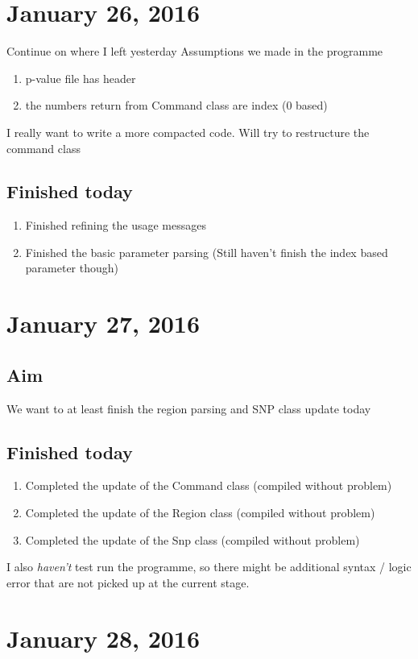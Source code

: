 \documentclass[12pt]{article}
\begin{document}
	\section{January 26, 2016}
	Continue on where I left yesterday
	Assumptions we made in the programme
	\begin{enumerate}
		\item p-value file has header
		\item the numbers return from Command class are index (0 based)
	\end{enumerate}
	I really want to write a more compacted code.
	Will try to restructure the command class
	\subsection{Finished today}
	\begin{enumerate}
		\item Finished refining the usage messages
		\item Finished the basic parameter parsing (Still haven't finish the index based parameter though)
	\end{enumerate}
	\section{January 27, 2016}
	\subsection{Aim}
	We want to at least finish the region parsing and SNP class update today
	\subsection{Finished today}
	\begin{enumerate}
		\item Completed the update of the Command class (compiled without problem)
		\item Completed the update of the Region class (compiled without problem)
		\item Completed the update of the Snp class (compiled without problem)
	\end{enumerate}
	I also \emph{haven't} test run the programme, so there might be additional syntax / logic error that are not picked up at the current stage.
	
	\section{January 28, 2016}
\end{document}
